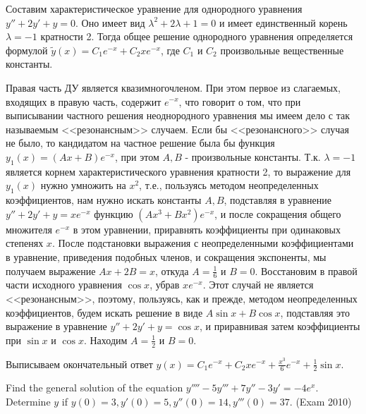 \begin{solution}
Составим характеристическое уравнение для однородного уравнения $y''+2y'+y=0$. Оно имеет вид $\lambda ^{2} +2\lambda +1=0$ и имеет единственный корень $\lambda =-1$ кратности 2. Тогда общее решение однородного уравнения определяется формулой $\tilde{y}(x)=C_{1} e^{-x} +C_{2} xe^{-x} $, где $C_{1} $ и $C_{2} $ произвольные вещественные константы.

Правая часть ДУ является квазимногочленом. При этом первое из слагаемых, входящих в правую часть, содержит $e^{-x} $, что говорит о том, что при выписывании частного решения неоднородного уравнения мы имеем дело с так называемым <<резонансным>> случаем. Если бы <<резонансного>> случая не было, то кандидатом на частное решение была бы функция $y_{1} (x)=(Ax+B)e^{-x} $, при этом $A, B$ - произвольные константы. Т.к. $\lambda =-1$ является корнем характеристического уравнения кратности 2, то выражение для $y_{1} (x)$ нужно умножить на $x^{2} $, т.е., пользуясь методом неопределенных коэффициентов, нам нужно искать константы $A, B$, подставляя в уравнение $y''+2y'+y=xe^{-x} $ функцию $(Ax^{3} +Bx^{2} )e^{-x} $, и после сокращения общего множителя $e^{-x} $ в этом уравнении, приравнять коэффициенты при одинаковых степенях $x$. После подстановки выражения с неопределенными коэффициентами в уравнение, приведения подобных членов, и сокращения экспоненты, мы получаем выражение $Ax+2B=x$, откуда $A=\frac{1}{6} $ и $B=0$. Восстановим в правой части исходного уравнения $\cos x$, убрав $xe^{-x} $. Этот случай не является <<резонансным>>, поэтому, пользуясь, как и прежде, методом неопределенных коэффициентов, будем искать решение в виде $A\sin x+B\cos x$, подставляя это выражение в уравнение $y''+2y'+y=\cos x$, и приравнивая затем коэффициенты при $\sin x$ и $\cos x$. Находим $A=\frac{1}{2} $ и $B=0$.

Выписываем окончательный ответ $y(x)=C_{1} e^{-x} +C_{2} xe^{-x} +\frac{x^{3} }{6} e^{-x} +\frac{1}{2} \sin x$.
\end{solution}

\begin{problem}
Find the general solution of the equation $y''''-5y'''+7y''-3y'=-4e^{x} $. Determine $y$ if $y(0)=3, y'(0)=5, y''(0)=14, y'''(0)=37.$ (Exam 2010)
\end{problem}

